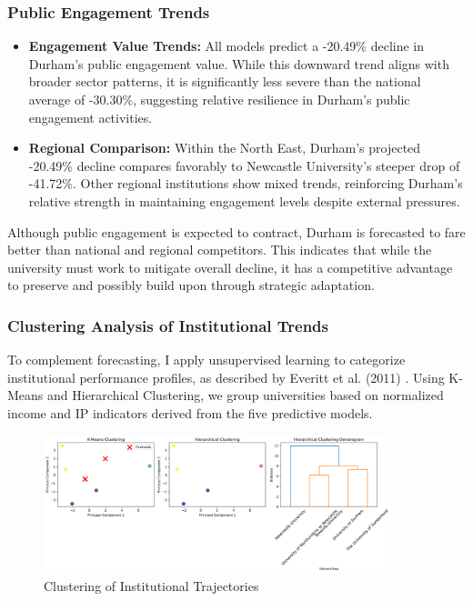 \documentclass[journal,onecolumn, 10pt,draftclsnofoot]{IEEEtran}
\begin{document}
\subsubsection{Public Engagement Trends}

\begin{itemize}
    \item \textbf{Engagement Value Trends:} All models predict a -20.49\% decline in Durham's public engagement value. While this downward trend aligns with broader sector patterns, it is significantly less severe than the national average of -30.30\%, suggesting relative resilience in Durham's public engagement activities.
    
    \item \textbf{Regional Comparison:} Within the North East, Durham's projected -20.49\% decline compares favorably to Newcastle University's steeper drop of -41.72\%. Other regional institutions show mixed trends, reinforcing Durham's relative strength in maintaining engagement levels despite external pressures.
\end{itemize}

Although public engagement is expected to contract, Durham is forecasted to fare better than national and regional competitors. This indicates that while the university must work to mitigate overall decline, it has a competitive advantage to preserve and possibly build upon through strategic adaptation.

\subsubsection{Clustering Analysis of Institutional Trends}

To complement forecasting, I apply unsupervised learning to categorize institutional performance profiles, as described by Everitt et al. (2011) \cite{everitt2011cluster}. Using K-Means and Hierarchical Clustering, we group universities based on normalized income and IP indicators derived from the five predictive models.



\begin{figure}[h]
\centering
\includegraphics[width=0.9\textwidth]{Fig/figure44.clustering_analysis.png}
\caption{Clustering of Institutional Trajectories}
\label{fig:clustering-analysis}
\end{figure}
\end{document}
